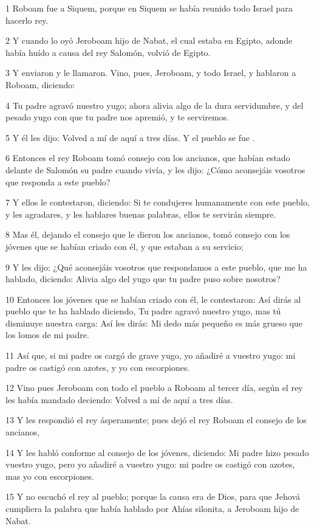 \par 1 Roboam fue a Siquem, porque en Siquem se había reunido todo Israel para hacerlo rey.
\par 2 Y cuando lo oyó Jeroboam hijo de Nabat, el cual estaba en Egipto, adonde había huído a causa del rey Salomón, volvió de Egipto. 
\par 3 Y enviaron y le llamaron. Vino, pues, Jeroboam, y todo Israel, y hablaron a Roboam, diciendo:
\par 4 Tu padre agravó nuestro yugo; ahora alivia algo de la dura servidumbre, y del pesado yugo con que tu padre nos apremió, y te serviremos.
\par 5 Y él les dijo: Volved a mí de aquí a tres días. Y el pueblo se fue .
\par 6 Entonces el rey Roboam tomó consejo con los ancianos, que habían estado delante de Salomón su padre cuando vivía, y les dijo: ¿Cómo aconsejáis vosotros que responda a este pueblo?
\par 7 Y ellos le contestaron, diciendo: Si te condujeres humanamente con este pueblo, y les agradares, y les hablares buenas palabras, ellos te servirán siempre.
\par 8 Mas él, dejando el consejo que le dieron los ancianos, tomó consejo con los jóvenes que se habían criado con él, y que estaban a su servicio;
\par 9 Y les dijo: ¿Qué aconsejáis vosotros que respondamos a este pueblo, que me ha hablado, diciendo: Alivia algo del yugo que tu padre puso sobre nosotros?
\par 10 Entonces los jóvenes que se habían criado con él, le contestaron: Así dirás al pueblo que te ha hablado diciendo, Tu padre agravó nuestro yugo, mas tú disminuye nuestra carga: Así les dirás: Mi dedo más pequeño es más grueso que los lomos de mi padre.
\par 11 Así que, si mi padre os cargó de grave yugo,  yo añadiré a vuestro yugo: mi padre os castigó con azotes, y yo con escorpiones.
\par 12 Vino pues Jeroboam con todo el pueblo a Roboam al tercer día, según el rey les había mandado deciendo: Volved a mí de aquí a tres días.
\par 13 Y les respondió el rey ásperamente; pues dejó el rey Roboam el consejo de los ancianos,
\par 14 Y les habló conforme al consejo de los jóvenes, diciendo: Mi padre hizo pesado vuestro yugo, pero yo añadiré a vuestro yugo: mi padre os castigó con azotes, mas yo con escorpiones.
\par 15 Y no escuchó el rey al pueblo; porque la causa era de Dios, para que Jehová cumpliera la palabra que había hablado por Ahías silonita, a Jeroboam hijo de Nabat.
